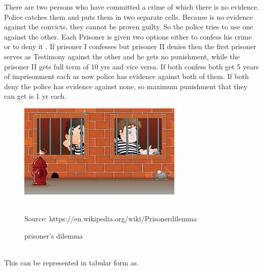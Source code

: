 There are two persons who have committed a crime of which there is no evidence. Police catches them and puts them in two separate cells. Because is no evidence against the convicts, they cannot be proven guilty. So the police tries to use one against the other. Each Prisoner is given  two options either to confess  his crime or to deny it . If prisoner I confesses but prisoner II denies then the first prisoner serves as Testimony against the other and he gets no punishment, while the prisoner II gets full term of 10 yrs and vice versa. If both confess both get 5 years of imprisonment each as now police has evidence against both of them. If both deny the police has evidence against none, so maximum punishment that they can get is 1 yr each.\\
\begin{figure}
    \centering
    \includegraphics[]{dilemma.png}
    \caption{prisoner's dilemma}\\
    Source: https://en.wikipedia.org/wiki/Prisonerdilemma
\end{figure}

\\
This can be represented in tabular form as.

